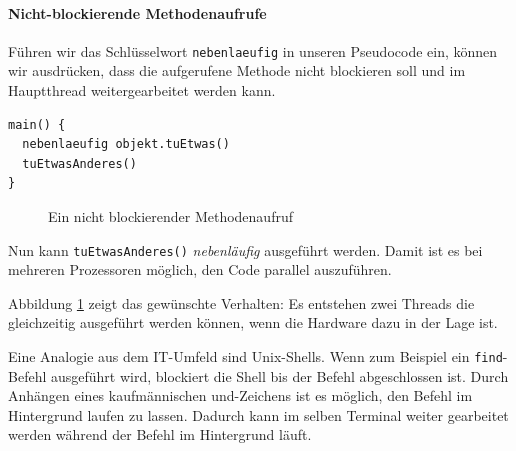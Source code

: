 \paragraph{Nicht-blockierende Methodenaufrufe} Führen wir das Schlüsselwort
\texttt{nebenlaeufig} in unseren Pseudocode ein,
können wir ausdrücken, dass die aufgerufene Methode nicht blockieren soll
und im Hauptthread weitergearbeitet werden kann.

\begin{lstlisting}[caption={Nebenläufiger Methodenaufruf},label={lst:codeConcurrent},captionpos=b]
main() {
  nebenlaeufig objekt.tuEtwas()
  tuEtwasAnderes()
}
\end{lstlisting}

\begin{figure}[htbp]
  \centering
  \caption{Ein nicht blockierender Methodenaufruf }
  \label{nonBlockingCall}
\end{figure}

Nun kann \texttt{tuEtwasAnderes()} \emph{nebenläufig} ausgeführt werden. Damit
ist es bei mehreren Prozessoren möglich, den Code parallel auszuführen.

Abbildung \ref{nonBlockingCall} zeigt das gewünschte Verhalten:
Es entstehen zwei Threads die gleichzeitig ausgeführt werden können,
wenn die Hardware dazu in der Lage ist.

Eine Analogie aus dem IT-Umfeld sind Unix-Shells. Wenn zum Beispiel ein
\texttt{find}-Befehl ausgeführt wird, blockiert die Shell bis der Befehl
abgeschlossen ist. Durch Anhängen eines kaufmännischen \glqq und\grqq{}-Zeichens 
ist es möglich,
den Befehl im Hintergrund laufen zu lassen. Dadurch kann im selben
Terminal weiter gearbeitet werden während der Befehl im Hintergrund
läuft.

